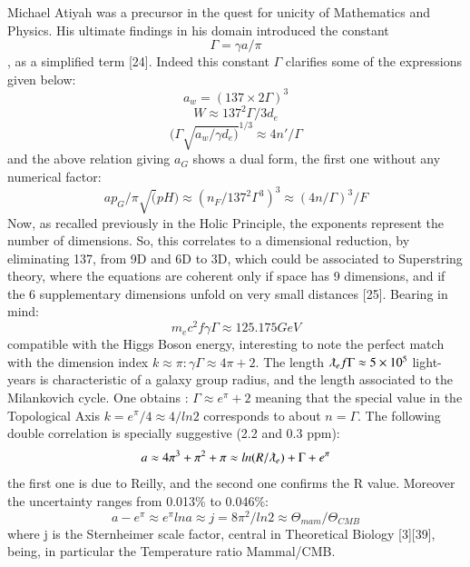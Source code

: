 \documentclass[twoside,draft]{article}
\begin{document}
\begin{sloppypar}
{Michael Atiyah was a precursor in the quest for unicity of Mathematics and Physics. His ultimate
findings in his domain introduced the constant $$\Gamma = \gamma a/\pi$$, as a simplified term [24]. Indeed this
constant $\Gamma$ clarifies some of the expressions given below:
\begin{equation}
a_{w} = (137 \times 2 \Gamma)^{3}
\end{equation}
\begin{equation}
W \approx 137^{2} \Gamma / 3d_{e}
\end{equation}
\begin{equation}
( \Gamma\sqrt{a_{w}/\gamma d_{e})}^{1/3} \approx 4n\prime / \Gamma
\end{equation}
and the above relation giving $a_{G}$ shows a dual form, the first one without any numerical factor:
\begin{equation}
ap_{G} / \pi \sqrt(pH) \approx (n_{F}/137^{2} \Gamma^{3} )^{3} \approx (4n/ \Gamma)^{3}/F
\end{equation}
Now, as recalled previously in the Holic Principle, the exponents represent the number of
dimensions. So, this correlates to a dimensional reduction, by eliminating 137, from 9D and 6D to
3D, which could be associated to Superstring theory, where the equations are coherent only if space
has 9 dimensions, and if the 6 supplementary dimensions unfold on very small distances [25].
Bearing in mind:
\begin{equation}
m_{e} c^{2} f{\gamma\Gamma} \approx 125.175 GeV
\end{equation}
compatible with the Higgs Boson energy, interesting to note the perfect match with the dimension index $k \approx \pi: \gamma\Gamma
\approx 4\pi + 2$. The length $\lambdabar_{e} f{\Gamma} \approx 5\times 10^{5}$ light-years is characteristic of a galaxy group radius, and the length associated to the Milankovich cycle. One obtains :
$\Gamma \approx e^\pi + 2$
meaning that the special value in the Topological Axis $k = e^{\pi} /4 \approx 4/ln2$ corresponds to about $n = \Gamma$.
The following double correlation is specially suggestive (2.2 and 0.3 ppm):
\begin{equation}
a \approx 4\pi^{3} + \pi^{2} + \pi \approx ln(R/\lambdabar_{e} ) + \Gamma + e^{\pi}
\end{equation}
the first one is due to Reilly, and the second one confirms the R value. Moreover the uncertainty ranges from 0.013\% to 0.046\%:
\begin{equation}
a - e^{\pi} \approx e^{\pi} lna \approx j = 8\pi^{2} /ln2 \approx \Theta_{mam} /\Theta_{CMB}
\end{equation}
where j is the Sternheimer scale factor, central in Theoretical Biology [3][39], being, in particular the
Temperature ratio Mammal/CMB.

}
\end{sloppypar}
\end{document}
